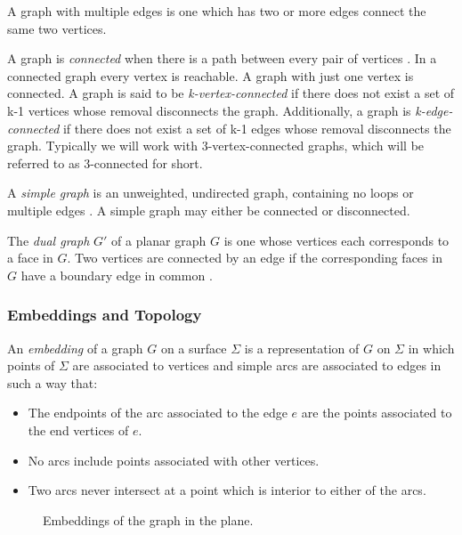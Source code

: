 \documentclass[11pt]{article}
\begin{document}
  A graph with multiple edges is one which has two or more edges connect the same two vertices.

  A graph is \emph{connected} when there is a path between every pair of vertices \cite{mathworld:ConnectedGraphs}. 
  In a connected graph every vertex is reachable. A graph with just one vertex is connected. A graph is said to be \emph{k-vertex-connected} if there does not exist a set of k-1 vertices whose removal disconnects the graph. Additionally, a graph is \emph{k-edge-connected} if there does not exist a set of k-1 edges whose removal disconnects the graph. Typically we will work with 3-vertex-connected graphs, which will be referred to as 3-connected for short.
  
  A \emph{simple graph} is an unweighted, undirected graph, containing no loops or multiple edges \cite{mathworld:SimpleGraphs}. 
  A simple graph may either be connected or disconnected.
  
  The \emph{dual graph} $G'$ of a planar graph $G$ is one whose vertices each corresponds to a face in $G$. Two vertices are connected by an edge if the corresponding faces in $G$ have a boundary edge in common \cite{dualGraph}. 
  
  \subsubsection{Embeddings and Topology}
    An \emph{embedding} of a graph $G$ on a surface $\Sigma$ is a representation of $G$ on $\Sigma$ in which points of $\Sigma$ are associated to vertices and simple arcs are associated to edges in such a way that:
  \begin{itemize}
	\item The endpoints of the arc associated to the edge $e$ are the points associated to the end vertices of $e$.
	\item No arcs include points associated with other vertices.
	\item Two arcs never intersect at a point which is interior to either of the arcs.
  \end{itemize}
  
  \begin{figure}%
	\centering
	\qquad
	\caption[]{Embeddings of the graph in the plane.}%
	\label{fig:embedding}
\end{figure}
\end{document}

